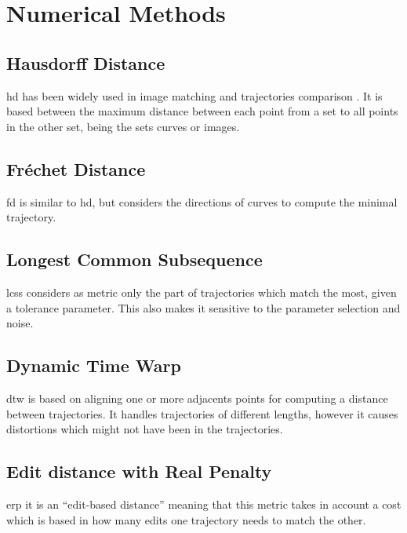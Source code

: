 \section{Numerical Methods}\label{sec: numerical methods}

\subsection*{Hausdorff Distance}

\gls{hd} has been widely used in image matching \cite{huttenlocher1993comparing,jesorsky2001robust} and trajectories comparison \cite{belogay1997calculating}. It is based between the maximum distance between each point from a set to all points in the other set, being the sets curves or images.

\subsection*{Fréchet Distance}

\gls{fd} \cite{eiter1994computing} is similar to \gls{hd}, but considers the directions of curves to compute the minimal trajectory.


\subsection*{Longest Common Subsequence}

\gls{lcss} \cite{maier1978complexity} considers as metric only the part of trajectories which match the most, given a tolerance parameter. This also makes it sensitive to the parameter selection and noise.

\subsection*{Dynamic Time Warp}

\gls{dtw} \cite{sankoff1983time,yi1998efficient} is based on aligning one or more adjacents points for computing a distance between trajectories. It handles trajectories of different lengths, however it causes distortions which might not have been in the trajectories.

\subsection*{Edit distance with Real Penalty}

\gls{erp} \cite{chen2004marriage} it is an ``edit-based distance'' meaning that this metric takes in account a cost which is based in how many edits one trajectory needs to match the other. 

